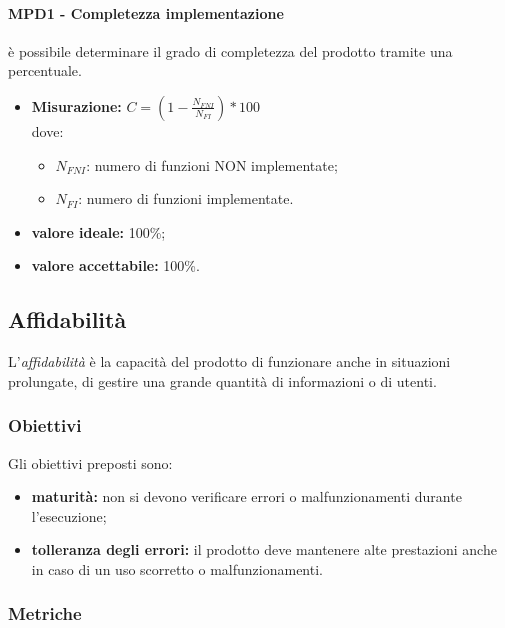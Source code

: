 \paragraph{MPD1 - Completezza implementazione} è possibile determinare il grado di completezza del prodotto tramite una percentuale.
\begin{itemize}
	\item \textbf{Misurazione:} \begin{math}C=\left(1-\frac{N_{FNI}}{N_{FI}}\right)*100\end{math}\\
	dove:
	\begin {itemize}
		\item \begin{math}N_{FNI}\end{math}: numero di funzioni NON implementate;
		\item \begin{math}N_{FI}\end{math}: numero di funzioni implementate.
	\end{itemize}
	\item \textbf{valore ideale:} 100\%;
	\item \textbf{valore accettabile:} 100\%.
\end{itemize}

\subsection{Affidabilità}
L'\textit{affidabilità} è la capacità del prodotto di funzionare anche in situazioni prolungate, di gestire una grande quantità di informazioni o di utenti.
\subsubsection{Obiettivi}
Gli obiettivi preposti sono:
\begin {itemize}
	\item \textbf{maturità:} non si devono verificare errori o malfunzionamenti durante l'esecuzione;
	\item \textbf{tolleranza degli errori:} il prodotto deve mantenere alte prestazioni anche in caso di un uso scorretto o malfunzionamenti.
\end{itemize}
\subsubsection{Metriche}
